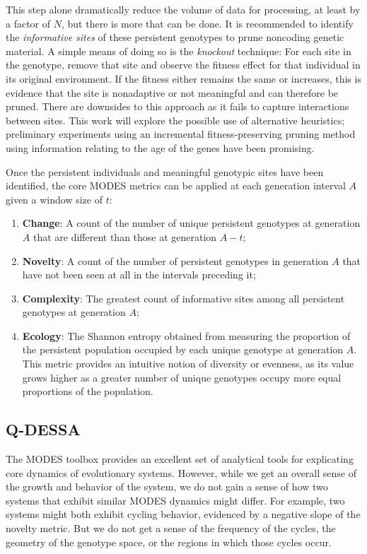 \documentclass{article}
\begin{document}
This step alone dramatically reduce the volume of data for processing, at least by a factor of 
$N$, but there is more that can be done. It is recommended to identify the 
\textit{informative sites} of these persistent genotypes to prune noncoding genetic material. 
A simple means of doing so is the \textit{knockout} technique: For each site in the genotype, 
remove that site and observe the fitness effect for that individual in its original environment. 
If the fitness either remains the same or increases, this is evidence that the site is nonadaptive 
or not meaningful and can therefore be pruned. There are downsides to this approach as it fails to 
capture interactions between sites. This work will explore the possible use of alternative 
heuristics; preliminary experiments using an incremental fitness-preserving pruning method 
using information relating to the age of the genes have been promising.

Once the persistent individuals and meaningful genotypic sites have been identified, the core 
MODES metrics can be applied at each generation interval $A$ given a window size of $t$:
\begin{enumerate}
    \item \textbf{Change}: A count of the number of unique persistent genotypes at generation 
        $A$ that are different than those at generation $A - t$;
    \item \textbf{Novelty}: A count of the number of persistent genotypes in generation $A$ 
        that have not been seen at all in the intervals preceding it;
    \item \textbf{Complexity}: The greatest count of informative sites among all persistent 
        genotypes at generation $A$;
    \item \textbf{Ecology}: The Shannon entropy obtained from measuring the proportion of the 
        persistent population occupied by each unique genotype at generation $A$. This metric 
        provides an intuitive notion of diversity or evenness, as its value grows higher as a 
        greater number of unique genotypes occupy more equal proportions of the population. 
\end{enumerate}

\subsection*{Q-DESSA}
The MODES toolbox provides an excellent set of analytical tools for explicating core dynamics of 
evolutionary systems. However, while we get an overall sense of the growth and behavior of the
system, we do not gain a sense of how two systems that exhibit similar MODES dynamics might differ.
For example, two systems might both exhibit cycling behavior, evidenced by a negative slope of
the novelty metric. But we do not get a sense of the frequency of the cycles, the geometry of
the genotype space, or the regions in which those cycles occur.
\end{document}
